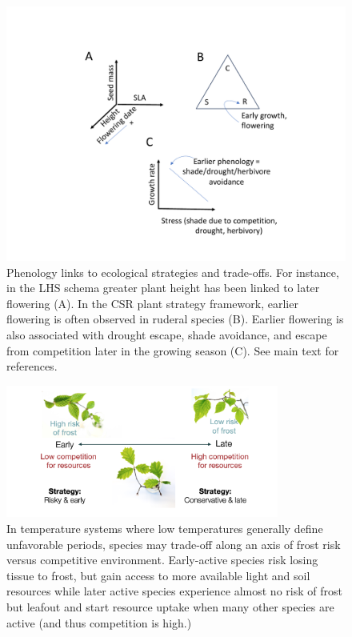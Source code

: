 \documentclass[11pt]{article}
\begin{document}
\begin{figure}[h!]
\centering
\includegraphics[width=1\textwidth]{..//figures/AREESfigure.pdf}
\caption{Phenology links to ecological strategies and trade-offs. For instance, in the LHS schema greater plant height has been linked to later flowering (A). In the CSR plant strategy framework, earlier flowering is often observed in ruderal species (B). Earlier flowering is also associated with drought escape, shade avoidance, and escape from competition later in the growing season (C). See main text for references.}
 \label{fig:traitcorr}
\end{figure}


\begin{figure}[h!]
\centering
\includegraphics[width=0.8\textwidth]{..//figures/wolkovich_CEFE2023wide_slide.png}
\caption{In temperature systems where low temperatures generally define unfavorable periods, species may trade-off along an axis of frost risk versus competitive environment. Early-active species risk losing tissue to frost, but gain access to more available light and soil resources while later active species experience almost no risk of frost but leafout and start resource uptake when many other species are active (and thus competition is high.)}
 \label{fig:seasonaltradeoffs}
\end{figure}
\end{document}
